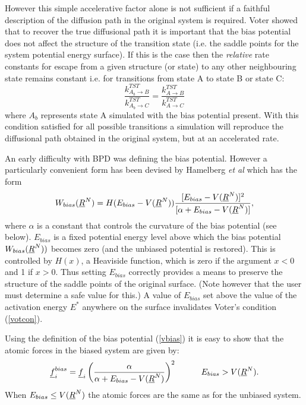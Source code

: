 However this simple accelerative factor alone is not sufficient if a
faithful description of the diffusion path in the original system is
required. Voter \cite{voter-97a} showed that to recover the true
diffusional path it is important that the bias potential does not
affect the structure of the transition state (i.e. the saddle points
for the system potential energy surface). If this is the case
then the {\em relative} rate constants for escape from a given structure (or
state) to any other neighbouring state remains constant i.e. for
transitions from state A to state B or state C:
\begin{equation}
\frac{k^{TST}_{A_{b}\rightarrow B}}{k^{TST}_{A_{b}\rightarrow C}}=
\frac{k^{TST}_{A\rightarrow B}}{k^{TST}_{A\rightarrow C}} \label{votcon}
\end{equation}
where $A_{b}$ represents state A simulated with the bias potential
present.  With this condition satisfied for all possible transitions a
simulation will reproduce the diffusional path obtained in the
original system, but at an accelerated rate.

An early difficulty with BPD was defining the bias potential. However
a particularly convenient form has been devised by Hamelberg {\em et
al} \cite{hamelberg-04a} which has the form
\begin{equation}
W_{bias}(\mbox{$\underline{R}$}^{N})=H(E_{bias}-V(\mbox{$\underline{R}$}^{N}))
\frac{[E_{bias}-V(\mbox{$\underline{R}$}^{N})]^{2}}
{[\alpha+E_{bias}-V(\mbox{$\underline{R}$}^{N})]}, \label{vbias}
\end{equation}
where $\alpha$ is a constant that controls the curvature of
the bias potential (see below). $E_{bias}$ is a fixed potential energy
level above which the bias potential $W_{bias}(\mbox{$\underline{R}$}^{N}))$ becomes
zero (and the unbiased potential is restored). This is controlled by
$H(x)$, a Heaviside function, which is zero if the argument $x<0$ and
1 if $x>0$. Thus setting $E_{bias}$ correctly provides a means to
preserve the structure of the saddle points of the original
surface. (Note however that the user must determine a safe value for
this.) A value of $E_{bias}$ set above the value of the activation
energy $E^{*}$ anywhere on the surface invalidates Voter's condition
(\ref{votcon}).

Using the definition of the bias potential (\ref{vbias}) it is easy to
show that the atomic forces in the biased system are given by:
\begin{equation}
\mbox{$\underline{f}$}_{i}^{bias}=\mbox{$\underline{f}$}_{i}\left 
(\frac{\alpha}{\alpha+E_{bias}-V(\mbox{$\underline{R}$}^{N})}\right )^{2}~~~~~~~~~E_{bias}>V(\mbox{$\underline{R}$}^{N}).
\end{equation}
When $E_{bias}\le V(\mbox{$\underline{R}$}^{N})$ the atomic forces are the same as
for the unbiased system.


